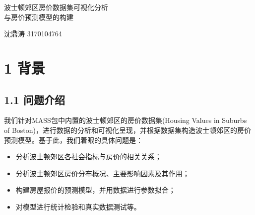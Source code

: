 \documentclass[UTF-8]{ctexart}
\begin{document}
	
	\pagestyle{fancy}
	\fancyhead{}
	
	\begin{center}
	\begin{LARGE}
		波士顿郊区房价数据集可视化分析 \\
		与房价预测模型的构建{\tiny }
	\end{LARGE}
	\vspace{0.5cm}
	
	\begin{Large}
		沈鼎涛 3170104764
	\end{Large}
	\end{center}
	\vspace{0.5cm}
	
	\tableofcontents
	
	\newpage
	
	\section{1 背景}
	
	\subsection{1.1 问题介绍}
	我们针对MASS包中内置的波士顿郊区的房价数据集(Housing Values in Suburbs of Boston)，进行数据的分析和可视化呈现，并根据数据集构造波士顿郊区的房价预测模型。基于此，我们着眼的具体问题是：
	\begin{itemize}
		\item 分析波士顿郊区各社会指标与房价的相关关系；
		\item 分析波士顿郊区房价分布概况、主要影响因素及其作用；
		\item 构建房屋报价的预测模型，并用数据进行参数拟合；
		\item 对模型进行统计检验和真实数据测试等。
	\end{itemize}
\end{document}
